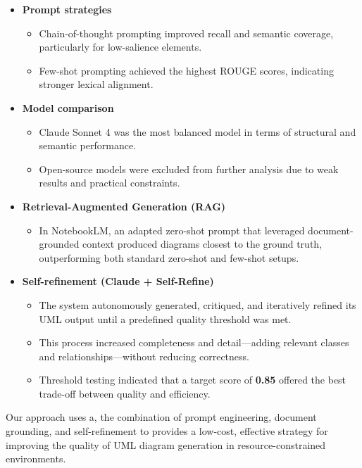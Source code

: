 \begin{itemize}
    \item \textbf{Prompt strategies}
    \begin{itemize}
        \item Chain-of-thought prompting improved recall and semantic coverage, particularly for low-salience elements.
        \item Few-shot prompting achieved the highest ROUGE scores, indicating stronger lexical alignment.
    \end{itemize}

    \item \textbf{Model comparison}
    \begin{itemize}
        \item Claude Sonnet 4 was the most balanced model in terms of structural and semantic performance.
        \item Open-source models were excluded from further analysis due to weak results and practical constraints.
    \end{itemize}

    \item \textbf{Retrieval-Augmented Generation (RAG)}
    \begin{itemize}
        \item In NotebookLM, an adapted zero-shot prompt that leveraged document-grounded context produced diagrams closest to the ground truth, outperforming both standard zero-shot and few-shot setups.
    \end{itemize}

    \item \textbf{Self-refinement (Claude + Self-Refine)}
    \begin{itemize}
        \item The system autonomously generated, critiqued, and iteratively refined its UML output until a predefined quality threshold was met.
        \item This process increased completeness and detail—adding relevant classes and relationships—without reducing correctness.
        \item Threshold testing indicated that a target score of \textbf{0.85} offered the best trade-off between quality and efficiency.
    \end{itemize}
\end{itemize}

Our approach uses a, the combination of prompt engineering, document grounding, and self-refinement to provides a low-cost, effective strategy for improving the quality of UML diagram generation in resource-constrained environments.